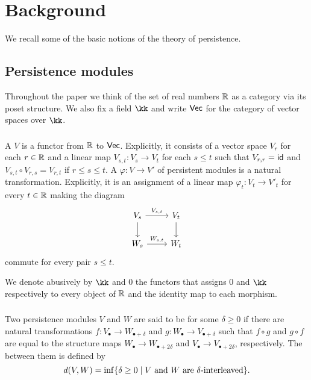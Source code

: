 
\section{Background}

We recall some of the basic notions of the theory of persistence.

\subsection{Persistence modules}

Throughout the paper we think of the set of real numbers $\R$ as a category via its poset structure.
We also fix a field $\kk$ and write $\Vec$ for the category of vector spaces over $\kk$.

\subsubsection{} A  $V$ is a functor from $\R$ to $\Vec$.
Explicitly, it consists of a vector space $V_r$ for each $r \in \R$ and a linear map $V_{s,t} \colon V_s \to V_t$ for each $s \leq t$ such that $V_{r,r} = \id$ and
$V_{s,t} \circ V_{r,s} = V_{r,t}$ if $r \leq s \leq t$.
A  $\varphi \colon V \to V'$ of persistent modules is a natural transformation.
Explicitly, it is an assignment of a linear map $\varphi_t \colon V_t \to V'_t$ for every $t \in \R$ making the diagram
\begin{equation*}
	\begin{tikzcd}
		V_{s} \arrow[r, "V_{s,t}"] \arrow[d] & V_{t} \arrow[d] \\
		W_{s} \arrow[r, "W_{s,t}"] & W_{t}
	\end{tikzcd}
\end{equation*}
commute for every pair $s \leq t$.

We denote abusively by $\kk$ and $0$ the functors that assigns $0$ and $\kk$ respectively to every object of $\R$ and the identity map to each morphism.


\subsubsection{} Two persistence modules $V$ and $W$ are said to be  for some $\delta \geq 0$ if there are natural transformations $f \colon V_{\bullet} \to W_{\bullet + \delta}$ and $g \colon W_{\bullet} \to V_{\bullet + \delta}$ such that $f \circ g$ and $g \circ f$ are equal to the structure maps $W_{\bullet} \to W_{\bullet + 2\delta}$ and $V_{\bullet} \to V_{\bullet + 2\delta}$, respectively.
The  between them is defined by
\[
d(V, W) = \inf\set{\delta \geq 0 \mid V \text{ and } W \text{ are } \delta\text{-interleaved}}.
\]

